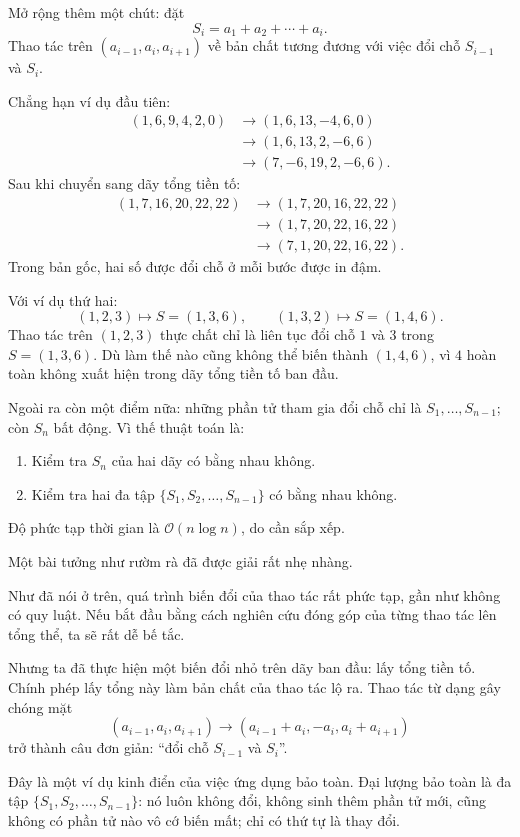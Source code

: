 \documentclass[11pt]{article}
\newcommand{\Oh}{\mathcal{O}}
\begin{document}
Mở rộng thêm một chút: đặt
\[
  S_i=a_1+a_2+\cdots+a_i.
\]
Thao tác trên \((a_{i-1},a_i,a_{i+1})\) về bản chất tương đương với việc đổi
chỗ \(S_{i-1}\) và \(S_i\).

Chẳng hạn ví dụ đầu tiên:
\[
\begin{aligned}
(1,6,9,4,2,0)&\to(1,6,13,-4,6,0)\\
&\to(1,6,13,2,-6,6)\\
&\to(7,-6,19,2,-6,6).
\end{aligned}
\]
Sau khi chuyển sang dãy tổng tiền tố:
\[
\begin{aligned}
(1,7,16,20,22,22)&\to(1,7,20,16,22,22)\\
&\to(1,7,20,22,16,22)\\
&\to(7,1,20,22,16,22).
\end{aligned}
\]
Trong bản gốc, hai số được đổi chỗ ở mỗi bước được in đậm.

Với ví dụ thứ hai:
\[
  (1,2,3)\mapsto S=(1,3,6),\qquad
  (1,3,2)\mapsto S=(1,4,6).
\]
Thao tác trên \((1,2,3)\) thực chất chỉ là liên tục đổi chỗ \(1\) và \(3\)
trong \(S=(1,3,6)\). Dù làm thế nào cũng không thể biến thành \((1,4,6)\),
vì \(4\) hoàn toàn không xuất hiện trong dãy tổng tiền tố ban đầu.

Ngoài ra còn một điểm nữa: những phần tử tham gia đổi chỗ chỉ là
\(S_1,\ldots,S_{n-1}\); còn \(S_n\) bất động. Vì thế thuật toán là:
\begin{enumerate}
  \item Kiểm tra \(S_n\) của hai dãy có bằng nhau không.
  \item Kiểm tra hai đa tập \(\{S_1,S_2,\ldots,S_{n-1}\}\) có bằng nhau không.
\end{enumerate}
Độ phức tạp thời gian là \(\Oh(n\log n)\), do cần sắp xếp.

Một bài tưởng như rườm rà đã được giải rất nhẹ nhàng.

Như đã nói ở trên, quá trình biến đổi của thao tác rất phức tạp, gần như không
có quy luật. Nếu bắt đầu bằng cách nghiên cứu đóng góp của từng thao tác lên
tổng thể, ta sẽ rất dễ bế tắc.

Nhưng ta đã thực hiện một biến đổi nhỏ trên dãy ban đầu: lấy tổng tiền tố.
Chính phép lấy tổng này làm bản chất của thao tác lộ ra. Thao tác từ dạng gây
chóng mặt
\[
  (a_{i-1},a_i,a_{i+1})
  \to
  (a_{i-1}+a_i,-a_i,a_i+a_{i+1})
\]
trở thành câu đơn giản: ``đổi chỗ \(S_{i-1}\) và \(S_i\)''.

Đây là một ví dụ kinh điển của việc ứng dụng bảo toàn. Đại lượng bảo toàn là
đa tập \(\{S_1,S_2,\ldots,S_{n-1}\}\): nó luôn không đổi, không sinh thêm phần
tử mới, cũng không có phần tử nào vô cớ biến mất; chỉ có thứ tự là thay đổi.
\end{document}
